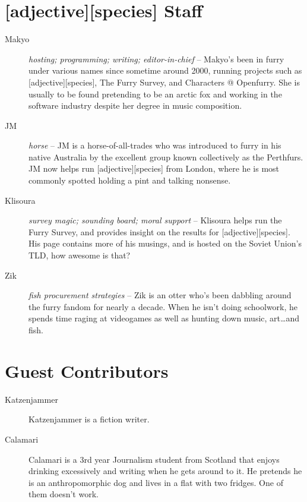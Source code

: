 \section*{[adjective][species] Staff}

\begin{description}
  \item[Makyo] \textit{hosting; programming; writing; editor-in-chief} -- Makyo's been in furry under various names since sometime around 2000, running projects such as [adjective][species], The Furry Survey, and Characters @ Openfurry.  She is usually to be found pretending to be an arctic fox and working in the software industry despite her degree in music composition.
  \item[JM] \textit{horse} -- JM is a horse-of-all-trades who was introduced to furry in his native Australia by the excellent group known collectively as the Perthfurs. JM now helps run [adjective][species] from London, where he is most commonly spotted holding a pint and talking nonsense.
  \item[Klisoura] \textit{survey magic; sounding board; moral support} -- Klisoura helps run the Furry Survey, and provides insight on the results for [adjective][species]. His page contains more of his musings, and is hosted on the Soviet Union's TLD, how awesome is that?
  \item[Zik] \textit{fish procurement strategies} -- Zik is an otter who's been dabbling around the furry fandom for nearly a decade. When he isn't doing schoolwork, he spends time raging at videogames as well as hunting down music, art\ldots and fish.
\end{description}

\section*{Guest Contributors}

\begin{description}
  \item[Katzenjammer] Katzenjammer is a fiction writer.
  \item[Calamari] Calamari is a 3rd year Journalism student from Scotland that enjoys drinking excessively and writing when he gets around to it. He pretends he is an anthropomorphic dog and lives in a flat with two fridges. One of them doesn't work.
\end{description}
